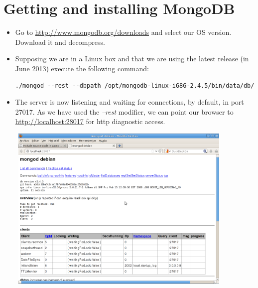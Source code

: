 \chapter{Getting and installing MongoDB}


\begin{itemize}

\item Go to \url{http://www.mongodb.org/downloads} and select our OS version. Download it and decompress.
\item Supposing we are in a Linux box and that we are using the latest release (in June 2013) execute the following command: \begin{verbatim}./mongod --rest --dbpath /opt/mongodb-linux-i686-2.4.5/bin/data/db/ \end{verbatim}                                                                                                     
\item The server is now listening and waiting for connections, by default, in port 27017. As we have used the \textit{--rest} modifier, we can point our browser to \url{http://localhost:28017} for http diagnostic access.

\includegraphics[width=11cm,height=8cm]{images/mongo_webconsole.png}

\end{itemize}